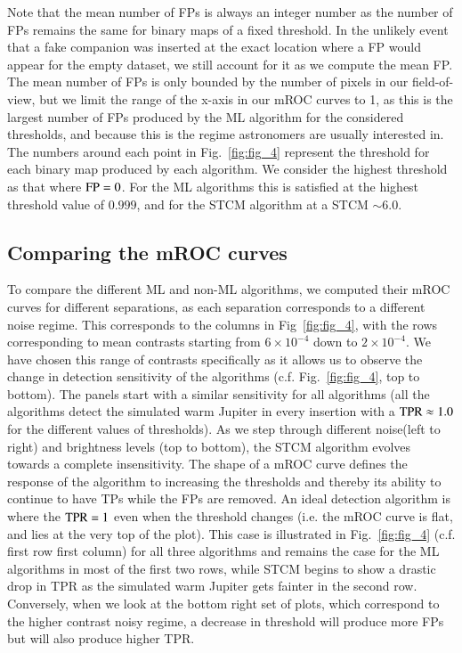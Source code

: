 \documentclass{aa}
\begin{document}
Note that the mean number of FPs is always an integer number as the number of FPs remains the same for binary maps of a fixed threshold.
In the unlikely event that a fake companion was inserted at the exact location where a FP would appear for the empty dataset, we still account for it as we compute the mean FP. The mean number of FPs is only bounded by the number of pixels in our field-of-view, but we limit the range of the x-axis in our mROC curves to 1, as this is the largest number of FPs produced by the ML algorithm for the considered thresholds, and because this is the regime astronomers are usually interested in.
The numbers around each point in Fig.~\ref{fig:fig_4} represent the threshold for each binary map produced by each algorithm.
We consider the highest threshold as that where ${\rm FP} = 0$.
For the ML algorithms this is satisfied at the highest threshold value of $0.999$, and for the STCM algorithm at a STCM $\sim 6.0$. 


\subsection{Comparing the mROC curves}
\label{sec:roc}

To compare the different ML and non-ML algorithms, we computed their mROC curves for different separations, as each separation corresponds to a different noise regime.
This corresponds to the columns in Fig~\ref{fig:fig_4}, with the rows corresponding to mean contrasts starting from $6\times10^{-4}$ down to $2\times10^{-4}$.
We have chosen this range of contrasts specifically as it allows us to observe the change in detection sensitivity of the algorithms (c.f. Fig.~\ref{fig:fig_4}, top to bottom). The panels start with a similar sensitivity for all algorithms (all the algorithms detect the simulated warm Jupiter in every insertion with a ${\rm TPR}\approx 1.0$ for the different values of thresholds). 
As we step through different noise(left to right) and brightness levels (top to bottom), the STCM algorithm evolves towards a complete insensitivity.
The shape of a mROC curve defines the response of the algorithm to increasing the thresholds and thereby its ability to continue to have TPs while the FPs are removed.
An ideal detection algorithm is where the ${\rm TPR}=1$ even when the threshold changes (i.e. the mROC curve is flat, and lies at the very top of the plot).
This case is illustrated in Fig.~\ref{fig:fig_4}  (c.f. first row first column) for all three algorithms and remains the case for the ML algorithms in most of the first two rows, while STCM begins to show a drastic drop in TPR as the simulated warm Jupiter gets fainter in the second row.
Conversely, when we look at the bottom right set of plots, which correspond to the higher contrast noisy regime, a decrease in threshold will produce more FPs but will also produce higher TPR. 
\end{document}
